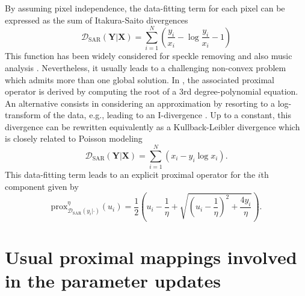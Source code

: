 \documentclass[review]{elsarticle}
\begin{document}
\begin{appendix}
By assuming pixel independence, the data-fitting term for each pixel can be expressed as the sum of Itakura-Saito divergences
%
\begin{equation}
\mathcal{D}_{\mathrm{SAR}}(\mathbf{Y}|\mathbf{X}) =
 \sum_{i=1}^N \left(\frac{y_i}{x_i} - \log \frac{y_i}{x_i} - 1\right)
\end{equation}
%
This function has been widely considered for speckle removing \citep{aubert_variational_2008,woo_proximal_2013} and also music analysis \citep{fevotte_nonnegative_2009}. Nevertheless, it usually leads to a challenging non-convex problem which admits more than one global solution. In \citet{sun_alternating_2014}, the associated proximal operator is derived by computing the root of a $3$rd degree-polynomial equation. An alternative consists in considering an approximation by resorting to a log-transform of the data, e.g., leading to an I-divergence \citep{woo_proximal_2013,steidl_removing_2010}. Up to a constant, this divergence can be rewritten equivalently as a Kullback-Leibler divergence which is closely related to Poisson modeling \citep{figueiredo_restoration_2010}
%
\begin{equation}
\mathcal{D}_{\mathrm{SAR}}(\mathbf{Y}|\mathbf{X}) = \sum_{i=1}^N \left(x_i - y_i \log x_i\right).
\end{equation}
%
This data-fitting term leads to an explicit proximal operator for the $i$th component given by
%
\begin{equation}
\mathrm{prox}^{\eta}_{\mathcal{D}_{\mathrm{SAR}}(y_i|\cdot)}\left(u_i\right) = \frac{1}{2}\left(u_i - \frac{1}{\eta} + \sqrt{\left(u_i - \frac{1}{\eta}\right)^2 + \frac{4y_i}{\eta}}\right).
\end{equation}

\section{Usual proximal mappings involved in the parameter updates}
\label{ap:proj}


\end{appendix}
\end{document}

